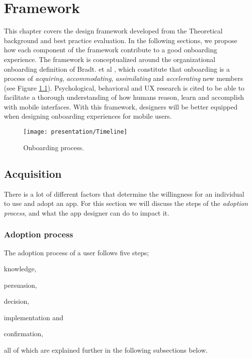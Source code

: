 \chapter{Framework}
\label{chap:framework}

This chapter covers the design framework developed from the Theoretical background and best practice evaluation. In the following sections, we propose how each component of the framework contribute to a good onboarding experience. The framework is conceptualized around the organizational onboarding definition of Bradt. et al \cite{Bradt2009}, which constitute that onboarding is a process of \textit{acquiring}, \textit{accommodating}, \textit{assimilating} and \textit{accelerating} new members (see Figure \ref{fig:process}). Psychological, behavioral and UX research is cited to be able to facilitate a thorough understanding of how humans reason, learn and accomplish with mobile interfaces. With this framework, designers will be better equipped when designing onboarding experiences for mobile users.

\begin{figure}[h]
  \centering
    \texttt{[image: presentation/Timeline]}
  \caption{Onboarding process.}
  \label{fig:process}
\end{figure}

\section{Acquisition}
There is a lot of different factors that determine the willingness for an individual to use and adopt an app. For this section we will discuss the steps of the \textit{adoption process}, and what the app designer can do to impact it.

\subsection{Adoption process}

The adoption process of a user follows five steps; \begin{enumerate*}[label=(\(\arabic*\))]
  \item knowledge,
  \item persuasion,
  \item decision,
  \item implementation and
  \item confirmation,
\end{enumerate*} all of which are explained further in the following subsections below.


